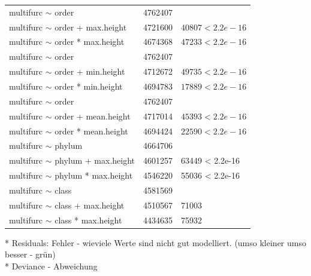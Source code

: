 \begin{center}
\begin{tabular}{ |l|r|l| }
            \hline \hline
            multifurc $\sim$ order & 4762407 & \\
            multifurc $\sim$ order + max.height & 4721600 & $40807 < 2.2e-16$ \\
            \rowcolor{green} multifurc $\sim$ order * max.height & 4674368 & $47233 < 2.2e-16$ \\
            \hline
            multifurc $\sim$ order & 4762407 & \\
            multifurc $\sim$ order + min.height & 4712672 & $49735 < 2.2e-16$ \\
            multifurc $\sim$ order * min.height & 4694783 & $17889 < 2.2e-16$ \\
            \hline
            multifurc $\sim$ order & 4762407 & \\
            multifurc $\sim$ order + mean.height & 4717014 & $45393 < 2.2e-16$ \\
            multifurc $\sim$ order * mean.height & 4694424 & $22590 < 2.2e-16$ \\
            \hline \hline
            multifurc $\sim$ phylum & 4664706 & \\
            multifurc $\sim$ phylum + max.height & 4601257 & 63449 < 2.2e-16 \\
            \rowcolor{green} multifurc $\sim$ phylum * max.height & 4546220 & 55036 < 2.2e-16 \\
            \hline \hline
            multifurc $\sim$ class & 4581569 & \\
            multifurc $\sim$ class + max.height & 4510567 & 71003 \\
            \rowcolor{green} multifurc $\sim$ class * max.height & 4434635 & 75932 \\
            
          \end{tabular}
        \end{center}
        * Residuals: Fehler - wieviele Werte sind nicht gut modelliert. (umso kleiner umso besser - grün)\\
        * Deviance - Abweichung

